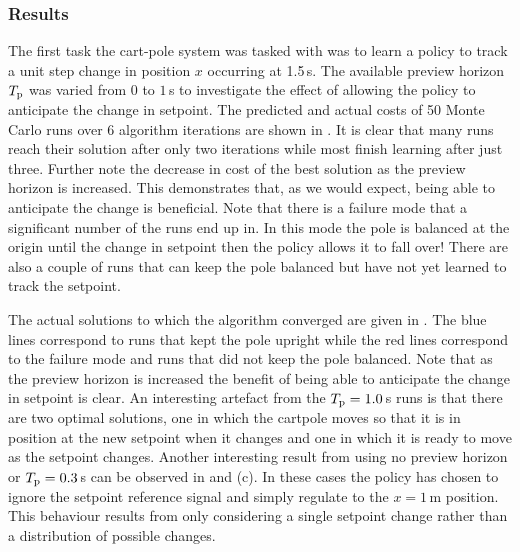 \subsubsection{Results}
The first task the cart-pole system was tasked with was to learn a policy to track a unit step change in position $x$ occurring at 1.5$\,$s. The available preview horizon $T_{\text{p}}$ was varied from $0$ to $1\,$s to investigate the effect of allowing the policy to anticipate the change in setpoint. The predicted and actual costs of 50 Monte Carlo runs over 6 algorithm iterations are shown in . It is clear that many runs reach their solution after only two iterations while most finish learning after just three. Further note the decrease in cost of the best solution as the preview horizon is increased. This demonstrates that, as we would expect, being able to anticipate the change is beneficial. Note that there is a failure mode that a significant number of the runs end up in. In this mode the pole is balanced at the origin until the change in setpoint then the policy allows it to fall over! There are also a couple of runs that can keep the pole balanced but have not yet learned to track the setpoint.





The actual solutions to which the algorithm converged are given in . The blue lines correspond to runs that kept the pole upright while the red lines correspond to the failure mode and runs that did not keep the pole balanced. Note that as the preview horizon is increased the benefit of being able to anticipate the change in setpoint is clear. An interesting artefact from the $T_{\text{p}} = 1.0\,$s runs is that there are two optimal solutions, one in which the cartpole moves so that it is in position at the new setpoint when it changes and one in which it is ready to move as the setpoint changes.
%
Another interesting result from using no preview horizon or $T_{\text{p}} = 0.3\,$s can be observed in  and (c). In these cases the policy has chosen to ignore the setpoint reference signal and simply regulate to the $x=1\,$m position. This behaviour results from only considering a single setpoint change rather than a distribution of possible changes.



